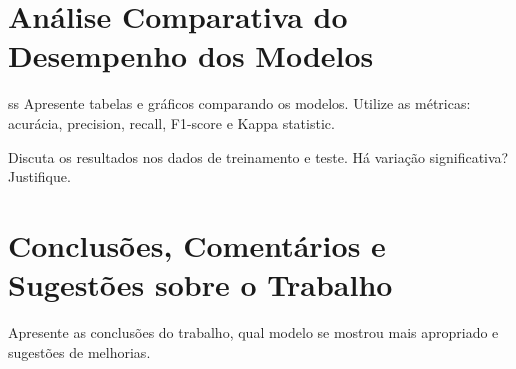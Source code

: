 \documentclass[12pt, a4paper]{article}
\begin{document}
\section{An\'alise Comparativa do Desempenho dos Modelos}
ss
Apresente tabelas e gr\'aficos comparando os modelos. Utilize as m\'etricas:
acur\'acia, precision, recall, F1-score e Kappa statistic.

Discuta os resultados nos dados de treinamento e teste. H\'a varia\c{c}\~ao
significativa? Justifique.


\section{Conclus\~oes, Coment\'arios e Sugest\~oes sobre o Trabalho}

Apresente as conclus\~oes do trabalho, qual modelo se mostrou mais apropriado
e sugest\~oes de melhorias.
\end{document}
